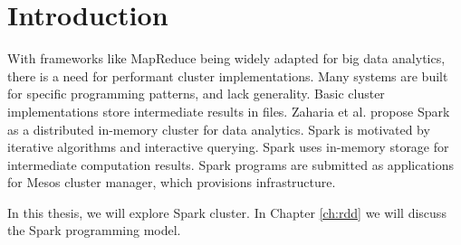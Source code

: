 \chapter{Introduction\label{intro}}

With frameworks like MapReduce being widely adapted for big data analytics, there is a need for performant cluster
implementations. Many systems are built for specific programming patterns, and lack generality. Basic cluster
implementations store intermediate results in files. Zaharia et al. propose Spark as a
distributed in-memory cluster for data analytics. Spark is motivated by iterative algorithms and interactive querying.
Spark uses in-memory storage for intermediate computation results. Spark programs are submitted as applications for
Mesos cluster manager, which provisions infrastructure.

In this thesis, we will explore Spark cluster. In Chapter \ref{ch:rdd} we will discuss the Spark programming model.
